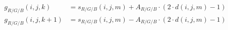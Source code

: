 \begin{equation}
\begin{split}
   g_{R/G/B}(i,j,k)  &= s_{R/G/B}(i,j,m) + A_{R/G/B} \cdot \left( 2 \cdot d(i,j,m) - 1 \right) \\
   g_{R/G/B}(i,j,k+1)&= s_{R/G/B}(i,j,m) - A_{R/G/B} \cdot \left( 2 \cdot d(i,j,m) - 1 \right) \\
\end{split}
\end{equation}






